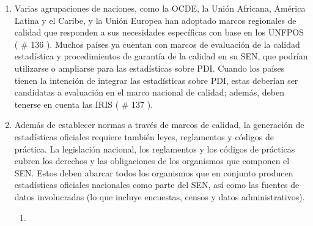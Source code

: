 \documentclass[
]{book}
\begin{document}
\begin{enumerate}
\def\labelenumi{\arabic{enumi}.}
\item
  Varias agrupaciones de naciones, como la OCDE, la Unión Africana, América Latina y el Caribe, y la Unión Europea han adoptado marcos regionales de calidad que responden a sus necesidades específicas con base en los UNFPOS (
  \# 136
  ). Muchos países ya cuentan con marcos de evaluación de la calidad estadística y procedimientos de garantía de la calidad en su SEN, que podrían utilizarse o ampliarse para las estadísticas sobre PDI. Cuando los países tienen la intención de integrar las estadísticas sobre PDI, estas deberían ser candidatas a evaluación en el marco nacional de calidad; además, deben tenerse en cuenta las IRIS (
  \# 137
  ).
\item
  Además de establecer normas a través de marcos de calidad, la generación de estadísticas oficiales requiere también leyes, reglamentos y códigos de práctica. La legislación nacional, los reglamentos y los códigos de prácticas cubren los derechos y las obligaciones de los organismos que componen el SEN. Estos deben abarcar todos los organismos que en conjunto producen estadísticas oficiales nacionales como parte del SEN, así como las fuentes de datos involucradas (lo que incluye encuestas, censos y datos administrativos).

  \begin{enumerate}
  \def\labelenumii{\arabic{enumii}.}
  \item ~
    \hypertarget{legislaciuxf3n-y-normativa-en-materia-de-estaduxedsticas-para-proteger-las-estaduxedsticas-oficiales}{%
}
\end{enumerate}
\end{enumerate}
\end{document}
